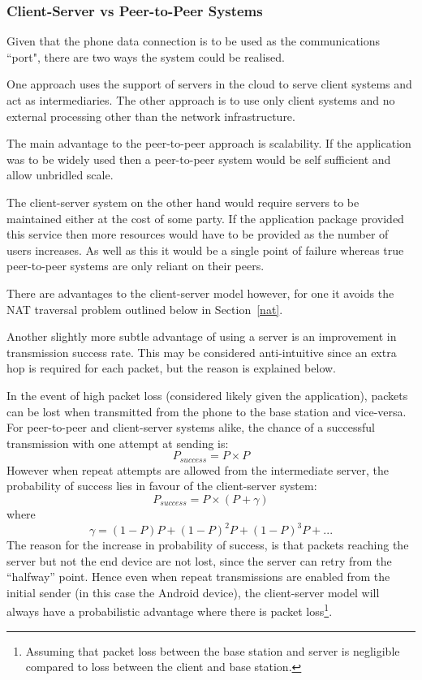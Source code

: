 \subsubsection{Client-Server vs Peer-to-Peer Systems}
\label{csvsp2p}

Given that the phone data connection is to be used as the communications ``port", there are two ways the system could be realised.

One approach uses the support of servers in the cloud to serve client systems and act as intermediaries. The other approach is to use only client systems and no external processing other than the network infrastructure.

The main advantage to the peer-to-peer approach is scalability. If the application was to be widely used then a peer-to-peer system would be self sufficient and allow unbridled scale.

The client-server system on the other hand would require servers to be maintained either at the cost of some party. If the application package provided this service then more resources would have to be provided as the number of users increases. As well as this it would be a single point of failure whereas true peer-to-peer systems are only reliant on their peers.

There are advantages to the client-server model however, for one it avoids the NAT traversal problem outlined below in Section~\ref{nat}.

Another slightly more subtle advantage of using a server is an improvement in transmission success rate. This may be considered anti-intuitive since an extra hop is required for each packet, but the reason is explained below.

In the event of high packet loss (considered likely given the application), packets can be lost when transmitted from the phone to the base station and vice-versa. For peer-to-peer and client-server systems alike, the chance of a successful transmission with one attempt at sending is:
\begin{equation}
P_{success} = P \times P
\end{equation}
However when repeat attempts are allowed from the intermediate server, the probability of success lies in favour of the client-server system:
\begin{equation}
P_{success} = P \times (P + \gamma)
\end{equation}
where
\begin{equation}
\gamma = (1-P)P + (1-P)^2P + (1-P)^3P + ...
\end{equation}
The reason for the increase in probability of success, is that packets reaching the server but not the end device are not lost, since the server can retry from the ``halfway'' point.
Hence even when repeat transmissions are enabled from the initial sender (in this case the Android device), the client-server model will always have a probabilistic advantage where there is packet loss\footnote{Assuming that packet loss between the base station and server is negligible compared to loss between the client and base station.}.

